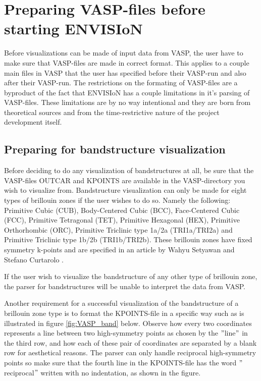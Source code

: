\section{Preparing VASP-files before starting ENVISIoN}
Before visualizations can be made of input data from VASP, the user have to make sure that VASP-files are made in correct format. This applies to a couple main files in VASP that the user has specified before their VASP-run and also after their VASP-run. The restrictions on the formating of VASP-files are a byproduct of the fact that ENVISIoN has a couple limitations in it's parsing of VASP-files. These limitations are by no way intentional and they are born from theoretical sources and from the time-restrictive nature of the project development itself. 
\subsection{Preparing for bandstructure visualization}

Before deciding to do any visualization of bandstructures at all, be sure that the VASP-files OUTCAR and KPOINTS are available in the VASP-directory you wish to visualize from. Bandstructure visualization can only be made for eight types of brillouin zones if the user wishes to do so. Namely the following: Primitive Cubic (CUB), Body-Centered Cubic (BCC), Face-Centered Cubic (FCC), Primitive Tetragonal (TET), Primitive Hexagonal (HEX), Primitive Orthorhombic (ORC), Primitive Triclinic type 1a/2a (TRI1a/TRI2a) and Primitive Triclinic type 1b/2b (TRI1b/TRI2b). These brillouin zones have fixed symmetry k-points and are specified in an article by Wahyu Setyawan and Stefano Curtarolo \cite{k-points}.

If the user wish to visualize the bandstructure of any other type of brillouin zone, the parser for bandstructures will be unable to interpret the data from VASP. 

Another requirement for a successful visualization of the bandstructure of a brillouin zone type is to format the KPOINTS-file in a specific way such as is illustrated in figure \ref{fig:VASP_band} below. Observe how every two coordinates represents a line between two high-symmetry points as chosen by the $"$line$"$ in the third row, and how each of these pair of coordinates are separated by a blank row for aesthetical reasons. The parser can only handle reciprocal high-symmetry points so make sure that the fourth line in the KPOINTS-file has the word $"$reciprocal$"$ written with no indentation, as shown in the figure.

